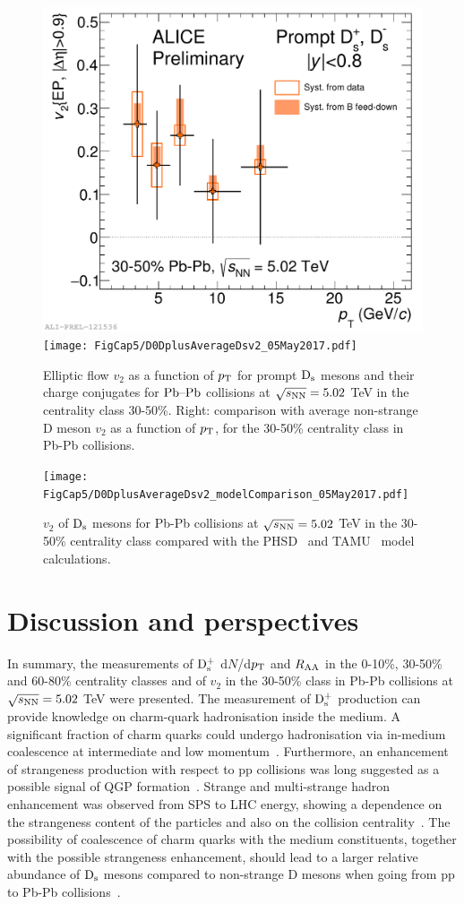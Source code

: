 \begin{figure}[!t]
\begin{center}
\includegraphics[width=.49\textwidth]{FigCap5/Dsv2_3050.pdf}
\texttt{[image: FigCap5/D0DplusAverageDsv2\_05May2017.pdf]}
\caption{Elliptic flow $v_2$ as a function of $p_{\rm T}$ for prompt ${\rm D_s}$ mesons 
and their charge conjugates for $\mbox{Pb--Pb}$ collisions at $\sqrt{s_{\rm NN}} = 5.02$ TeV in the centrality class 30-50\%.
Right: comparison with average non-strange D meson $v_2$ as a function 
of $p_{\rm T}$, for the 30-50\% centrality class in Pb-Pb collisions. }
\label{fig:v2_Ds} 
\end{center}
\end{figure}

\begin{figure}[!t]
\begin{center}
\texttt{[image: FigCap5/D0DplusAverageDsv2\_modelComparison\_05May2017.pdf]}
\caption{$v_2$ of ${\rm D_s}$ mesons for Pb-Pb collisions at $\sqrt{s_{\rm NN}} = 5.02$ TeV in the 30-50\% centrality class compared with the PHSD~\cite{Song:2015ykw}  and TAMU~\cite{He:2014cla} model calculations.}
\label{fig:v2_models} 
\end{center}
\end{figure}

\section{Discussion and perspectives}
\label{sec:discussionAA}
In summary, the measurements of ${\rm D_s^+}$ d$N$/d$p_{\rm T}$ and $R_{\rm AA}$ in the
0-10\%, 30-50\% and 60-80\% centrality classes and of $v_2$ in the 30-50\% class
in Pb-Pb collisions at $\sqrt{s_{\rm NN}} = 5.02$ TeV were presented. 
The measurement of ${\rm D_s^+}$ production can provide knowledge on 
charm-quark hadronisation inside the medium. 
A significant fraction of charm quarks could undergo hadronisation 
via in-medium coalescence at intermediate and low momentum~\cite{Greco:2003vf}. 
Furthermore, an enhancement of strangeness production with respect to 
pp collisions was long suggested as a possible signal of QGP formation~\cite{Rafelski:1982pu}. 
Strange and multi-strange hadron enhancement was observed from SPS to 
LHC energy, showing a dependence on the strangeness content of the 
particles and also on the collision centrality~\cite{ALICE:2017jyt,Appelshauser:1998va,Abelev:2007xp,Abelev:2013haa}.
 The possibility of coalescence 
of charm quarks with the medium constituents, together with the possible strangeness 
enhancement, should lead to a larger relative abundance of ${\rm D_s}$ mesons compared 
to non-strange D mesons when going from pp to Pb-Pb collisions~\cite{He:2012df}.\\



